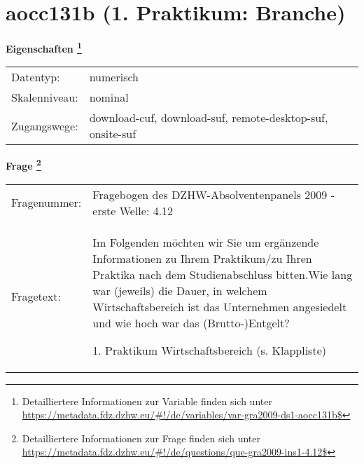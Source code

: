 
    \setcounter{footnote}{0}

    \vspace*{-1.8cm}
	\section{aocc131b (1. Praktikum: Branche)}
	\label{section:aocc131b}



    \vspace*{0.5cm}
    \noindent\textbf{Eigenschaften
	\footnote{Detailliertere Informationen zur Variable finden sich unter
		\url{https://metadata.fdz.dzhw.eu/\#!/de/variables/var-gra2009-ds1-aocc131b$}}}\\
	\begin{tabularx}{\hsize}{@{}lX}
	Datentyp: & numerisch \\
	Skalenniveau: & nominal \\
	Zugangswege: &
	  download-cuf, 
	  download-suf, 
	  remote-desktop-suf, 
	  onsite-suf
 \\
    \end{tabularx}



				\vspace*{0.5cm}
                \noindent\textbf{Frage
	                \footnote{Detailliertere Informationen zur Frage finden sich unter
		              \url{https://metadata.fdz.dzhw.eu/\#!/de/questions/que-gra2009-ins1-4.12$}}}\\
				\begin{tabularx}{\hsize}{@{}lX}
					Fragenummer: &
					  Fragebogen des DZHW-Absolventenpanels 2009 - erste Welle:
					  4.12
 \\
					Fragetext: & Im Folgenden möchten wir Sie um ergänzende Informationen zu Ihrem Praktikum/zu Ihren Praktika nach dem Studienabschluss bitten.Wie lang war (jeweils) die Dauer, in welchem Wirtschaftsbereich ist das Unternehmen angesiedelt und wie hoch war das (Brutto-)Entgelt?\par  1. Praktikum Wirtschaftsbereich (s. Klappliste) \\
				\end{tabularx}





